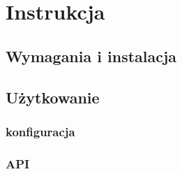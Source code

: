 \chapter{Instrukcja}


\section{Wymagania i instalacja}


\section{Użytkowanie}


\subsection{konfiguracja}


\subsection{API}


